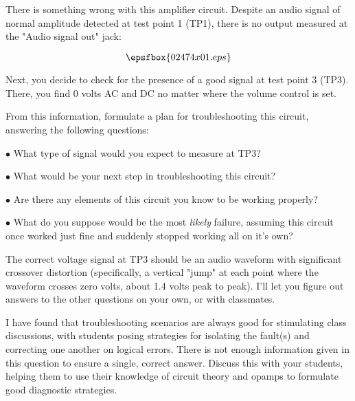 

There is something wrong with this amplifier circuit.  Despite an audio signal of normal amplitude detected at test point 1 (TP1), there is no output measured at the "Audio signal out" jack:

$$\epsfbox{02474x01.eps}$$

Next, you decide to check for the presence of a good signal at test point 3 (TP3).  There, you find 0 volts AC and DC no matter where the volume control is set.

From this information, formulate a plan for troubleshooting this circuit, answering the following questions:

\medskip
\goodbreak
\item{$\bullet$} What type of signal would you expect to measure at TP3?
\item{$\bullet$} What would be your next step in troubleshooting this circuit?
\item{$\bullet$} Are there any elements of this circuit you know to be working properly?
\item{$\bullet$} What do you suppose would be the most {\it likely} failure, assuming this circuit once worked just fine and suddenly stopped working all on it's own?
\medskip







The correct voltage signal at TP3 should be an audio waveform with significant crossover distortion (specifically, a vertical "jump" at each point where the waveform crosses zero volts, about 1.4 volts peak to peak).  I'll let you figure out answers to the other questions on your own, or with classmates.







I have found that troubleshooting scenarios are always good for stimulating class discussions, with students posing strategies for isolating the fault(s) and correcting one another on logical errors.  There is not enough information given in this question to ensure a single, correct answer.  Discuss this with your students, helping them to use their knowledge of circuit theory and opamps to formulate good diagnostic strategies.




